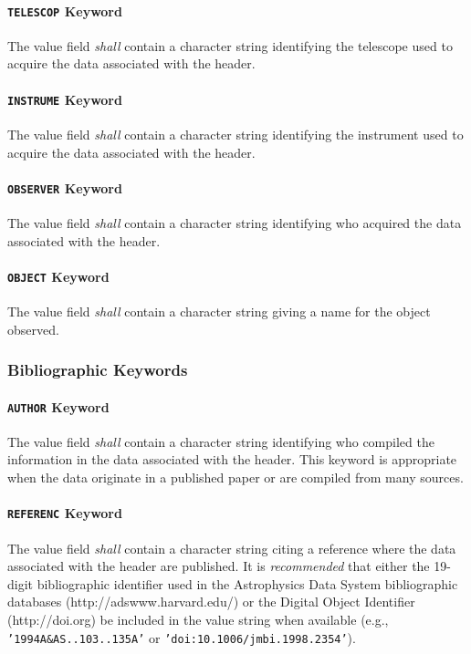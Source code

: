 \documentclass[11pt,makeidx]{book}     %
\begin{document}
 \paragraph{{\tt TELESCOP} Keyword}
 The value field {\em shall} contain a character 
 string
 identifying the telescope used to acquire the data
 associated with the header.
  
 \paragraph{{\tt INSTRUME} Keyword}
 The value field {\em shall} contain a character 
 string
 identifying the instrument used to acquire the data
 associated with the header.
  
 \paragraph{{\tt OBSERVER} Keyword}
 The value field {\em shall} contain a character string
 identifying who acquired the data associated with the header. 
   
 \paragraph{{\tt OBJECT} Keyword}
 The value field {\em shall} contain a character 
 string
 giving a name for the object observed.
  
 

    \subsubsection{Bibliographic Keywords}
  
 \paragraph{{\tt AUTHOR} Keyword}
 The value field {\em shall} contain a character 
 string
 identifying who compiled the information
 in the data associated with the header. This keyword
 is appropriate when the data originate in a published
 paper or are compiled from many sources.
  
 \paragraph{{\tt REFERENC} Keyword}
 The value field {\em shall} contain a character 
 string
 citing a reference where the data associated with the
 header are published.  It is {\em recommended} that either
 the 19-digit bibliographic identifier used 
 in the Astrophysics Data System bibliographic databases
 (http://adswww.harvard.edu/) 
 or the Digital Object Identifier (http://doi.org)
 be included in the value 
 string when available (e.g., {\tt '1994A\&AS..103..135A'}
 or {\tt 'doi:10.1006/jmbi.1998.2354'}).
  
\end{document}
